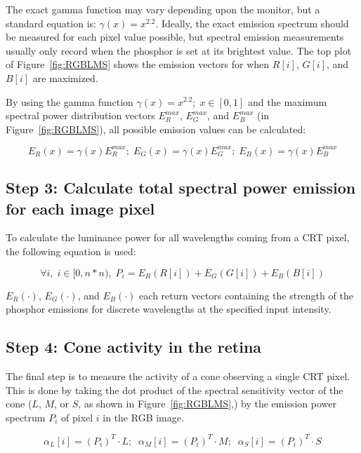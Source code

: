 \documentclass[12pt]{article}
\begin{document}
The exact gamma function may vary depending upon the monitor, but a
standard equation is: $\gamma(x) = x^{2.2}$.  Ideally, the exact
emission spectrum should be measured for each pixel value possible,
but spectral emission measurements usually only record when the
phosphor is set at its brightest value.  The top plot of
Figure~\ref{fig:RGBLMS} shows the emission vectors for when $R[i]$,
$G[i]$, and $B[i]$ are maximized.

By using the gamma function $\gamma(x) = x^{2.2}; \; x \in [0,1]$ and
the maximum spectral power distribution vectors $E_R^{max}$, $E_G^{max}$,
and $E_B^{max}$ (in Figure~\ref{fig:RGBLMS}), all possible emission
values can be calculated:

\begin{equation}
E_R(x) = \gamma(x)E_R^{max};\;
E_G(x) = \gamma(x)E_G^{max};\;
E_B(x) = \gamma(x)E_B^{max}
\end{equation}

\subsection{Step 3: Calculate total spectral power emission for each
image pixel}

To calculate the luminance power for all wavelengths coming from a CRT
pixel, the following equation is used:

\begin{equation}
\forall i,\; i \in [0,n*n),\; P_i = E_R (R[i]) + E_G (G[i]) + E_B (B[i])
\end{equation}

$E_R(\cdot)$, $E_G(\cdot)$, and $E_B(\cdot)$ each return vectors
containing the strength of the phosphor emissions for discrete
wavelengths at the specified input intensity.

\subsection{Step 4: Cone activity in the retina}

The final step is to measure the activity of a cone observing a single
CRT pixel.  This is done by taking the dot product of the spectral
sensitivity vector of the cone ($L$, $M$, or $S$, as shown in
Figure~\ref{fig:RGBLMS},) by the emission power spectrum $P_i$ of pixel
$i$ in the RGB image.

\begin{equation}
\alpha_L[i] = (P_i)^T \cdot L; \;\; \alpha_M[i] = (P_i)^T \cdot M; \;\; 
	\alpha_S[i] = (P_i)^T \cdot S 
\end{equation}
\end{document}
